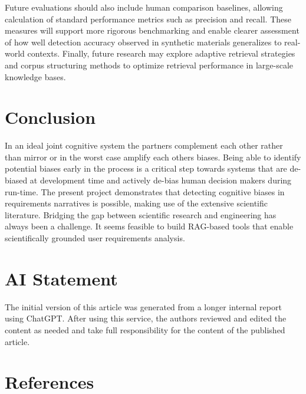 \documentclass[
  manuscript,
  anonymous,
  review]{acmart}
\begin{document}
Future evaluations should also include human comparison baselines,
allowing calculation of standard performance metrics such as precision
and recall. These measures will support more rigorous benchmarking and
enable clearer assessment of how well detection accuracy observed in
synthetic materials generalizes to real-world contexts. Finally, future
research may explore adaptive retrieval strategies and corpus
structuring methods to optimize retrieval performance in large-scale
knowledge bases.

\section{Conclusion}\label{conclusion}

In an ideal joint cognitive system the partners complement each other
rather than mirror or in the worst case amplify each others biases.
Being able to identify potential biases early in the process is a
critical step towards systems that are de-biased at development time and
actively de-bias human decision makers during run-time. The present
project demonstrates that detecting cognitive biases in requirements
narratives is possible, making use of the extensive scientific
literature. Bridging the gap between scientific research and engineering
has always been a challenge. It seems feasible to build RAG-based tools
that enable scientifically grounded user requirements analysis.

\section{AI Statement}\label{ai-statement}

The initial version of this article was generated from a longer internal
report using ChatGPT. After using this service, the authors reviewed and
edited the content as needed and take full responsibility for the
content of the published article.

\section*{References}\label{references}
\end{document}
